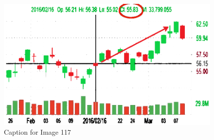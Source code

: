 \documentclass{article}
\begin{document}
\vspace{10pt}

\begin{figure}[!htb]
    \centering
    \includegraphics[width=\textwidth]{imgs/117.png}
    \caption{Caption for Image 117}
\end{figure}
\end{document}
